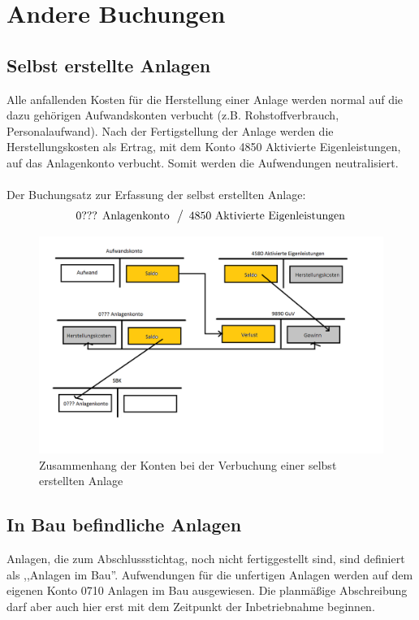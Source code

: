 \documentclass[a4paper,10pt]{report}
\begin{document}
\chapter{Andere Buchungen}
\thispagestyle{fancy}
\section{Selbst erstellte Anlagen}
Alle anfallenden Kosten für die Herstellung einer Anlage werden normal
auf die dazu gehörigen Aufwandskonten verbucht
(z.B. Rohstoffverbrauch, Personalaufwand). Nach der Fertigstellung der
Anlage werden die Herstellungskosten als Ertrag, mit dem Konto 4850
Aktivierte Eigenleistungen, auf das Anlagenkonto verbucht. Somit
werden die Aufwendungen neutralisiert.\\
\\
Der Buchungsatz zur Erfassung der selbst erstellten Anlage:
\begin{equation*}
  \begin{array}{l}
    \text{0??? Anlagenkonto}\\
  \end{array}
  \left\slash
    \begin{array}{l}
      \text{4850 Aktivierte Eigenleistungen}\\
    \end{array}
  \right.
\end{equation*}

\begin{figure}[ht]
\centering
\includegraphics[width=14cm]{Bilder/Eigenleistung-Konten_der_Bilanz}
\caption{Zusammenhang der Konten bei der Verbuchung einer selbst
erstellten Anlage}
\end{figure}

\section{In Bau befindliche Anlagen}
Anlagen, die zum Abschlussstichtag, noch nicht fertiggestellt sind,
sind definiert als ,,Anlagen im Bau''. Aufwendungen für die unfertigen
Anlagen werden auf dem eigenen Konto 0710 Anlagen im Bau
ausgewiesen. Die planmäßige Abschreibung darf aber auch hier erst mit
dem Zeitpunkt der Inbetriebnahme beginnen.\\
\end{document}
